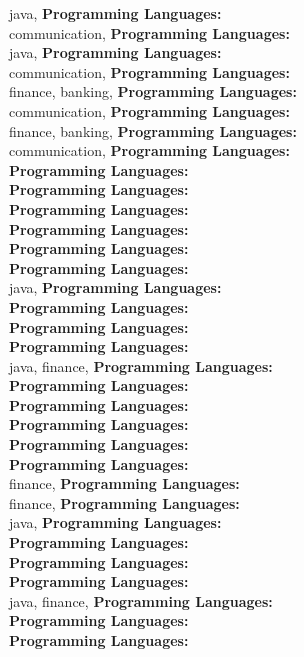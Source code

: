 java, \textbf{Programming Languages:} \\
communication, \textbf{Programming Languages:} \\
java, \textbf{Programming Languages:} \\
communication, \textbf{Programming Languages:} \\
finance, banking, \textbf{Programming Languages:} \\
communication, \textbf{Programming Languages:} \\
finance, banking, \textbf{Programming Languages:} \\
communication, \textbf{Programming Languages:} \\
\textbf{Programming Languages:} \\
\textbf{Programming Languages:} \\
\textbf{Programming Languages:} \\
\textbf{Programming Languages:} \\
\textbf{Programming Languages:} \\
\textbf{Programming Languages:} \\
java, \textbf{Programming Languages:} \\
\textbf{Programming Languages:} \\
\textbf{Programming Languages:} \\
\textbf{Programming Languages:} \\
java, finance, \textbf{Programming Languages:} \\
\textbf{Programming Languages:} \\
\textbf{Programming Languages:} \\
\textbf{Programming Languages:} \\
\textbf{Programming Languages:} \\
\textbf{Programming Languages:} \\
finance, \textbf{Programming Languages:} \\
finance, \textbf{Programming Languages:} \\
java, \textbf{Programming Languages:} \\
\textbf{Programming Languages:} \\
\textbf{Programming Languages:} \\
\textbf{Programming Languages:} \\
java, finance, \textbf{Programming Languages:} \\
\textbf{Programming Languages:} \\
\textbf{Programming Languages:} \\
